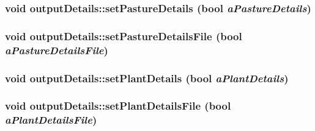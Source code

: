 \label{classoutput_details_ab3d48ad8246f20cd88a0fc30495d8a41}
\hypertarget{classoutput_details_a9f7d2f614fcd1a984c53911c96e8ed58}{
\subsubsection[{setPastureDetails}]{\setlength{\rightskip}{0pt plus 5cm}void outputDetails::setPastureDetails (bool {\em aPastureDetails})}}
\label{classoutput_details_a9f7d2f614fcd1a984c53911c96e8ed58}
\hypertarget{classoutput_details_a119112566be2fa83fbbb565d24b2833d}{
\subsubsection[{setPastureDetailsFile}]{\setlength{\rightskip}{0pt plus 5cm}void outputDetails::setPastureDetailsFile (bool {\em aPastureDetailsFile})}}
\label{classoutput_details_a119112566be2fa83fbbb565d24b2833d}
\hypertarget{classoutput_details_a95d748bfde90ff8289e78258aa53cedf}{
\subsubsection[{setPlantDetails}]{\setlength{\rightskip}{0pt plus 5cm}void outputDetails::setPlantDetails (bool {\em aPlantDetails})}}
\label{classoutput_details_a95d748bfde90ff8289e78258aa53cedf}
\hypertarget{classoutput_details_ae8d2954fa3d710ed6ef777a9ca07cae1}{
\subsubsection[{setPlantDetailsFile}]{\setlength{\rightskip}{0pt plus 5cm}void outputDetails::setPlantDetailsFile (bool {\em aPlantDetailsFile})}}
